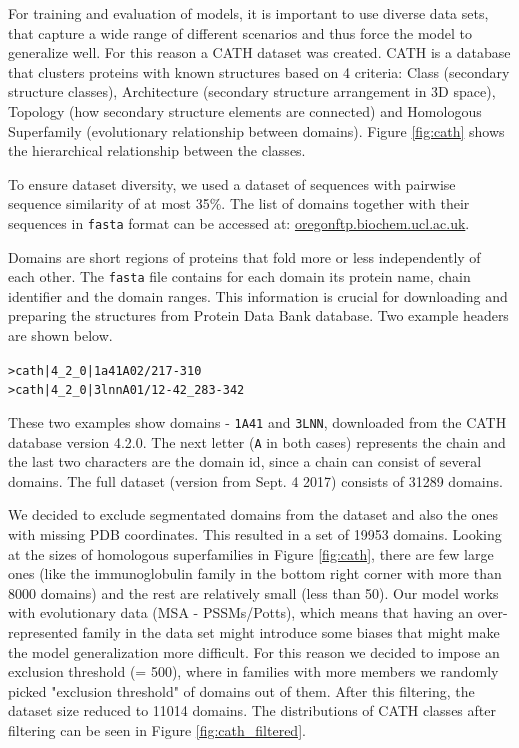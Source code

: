 For training and evaluation of models, it is important to use diverse data sets, that capture a wide range of different scenarios and thus force the model to generalize well. For this reason a CATH dataset was created.
CATH is a database that clusters proteins with known structures based on 4 criteria: Class (secondary structure classes), Architecture (secondary structure arrangement in 3D space), Topology (how secondary structure elements are connected) and Homologous Superfamily (evolutionary relationship between domains). 
Figure \ref{fig:cath} shows the hierarchical relationship between the classes.
    
To ensure dataset diversity, we used a dataset of sequences with pairwise sequence similarity of at most 35\%. 
The list of domains together with their sequences in \texttt{fasta} format can be accessed at: \href{ftp://orengoftp.biochem.ucl.ac.uk/cath/releases/latest-release/sequence-data/cath-domain-seqs-S35.fa}{oregonftp.biochem.ucl.ac.uk}.
    
Domains are short regions of proteins that fold more or less independently of each other. 
The \texttt{fasta} file contains for each domain its protein name, chain identifier and the domain ranges. 
This information is crucial for downloading and preparing the structures from Protein Data Bank database. 
Two example headers are shown below. 
    
\begin{center}
    \texttt{>cath|4\_2\_0|1a41A02/217-310}\\
    \texttt{>cath|4\_2\_0|3lnnA01/12-42\_283-342}
\end{center}
    
These two examples show domains - \texttt{1A41} and \texttt{3LNN}, downloaded from the CATH database version 4.2.0. 
The next letter (\texttt{A} in both cases) represents the chain and the last two characters are the domain id, since a chain can consist of several domains. 
The full dataset (version from Sept. 4 2017) consists of 31289 domains. 
    
We decided to exclude segmentated domains from the dataset and also the ones with missing PDB coordinates. 
This resulted in a set of 19953 domains. 
Looking at the sizes of homologous superfamilies in Figure \ref{fig:cath}, there are few large ones (like the immunoglobulin family in the bottom right corner with more than 8000 domains) and the rest are relatively small (less than 50). 
Our model works with evolutionary data (MSA - PSSMs/Potts), which means that having an over-represented family in the data set might introduce some biases that might make the model generalization more difficult. 
For this reason we decided to impose an exclusion threshold (= 500), where in families with more members we randomly picked "exclusion threshold" of domains out of them. 
After this filtering, the dataset size reduced to 11014 domains.
The distributions of CATH classes after filtering can be seen in Figure \ref{fig:cath_filtered}.
    
